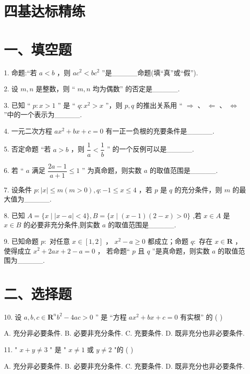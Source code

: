 \section*{四基达标精练}

\section*{一、填空题}

1. 命题:“若 $a < b$ ，则 $a{c}^{2} < b{c}^{2}$ ”是\_\_\_\_\_命题(填“真”或“假”).

2. 设 $m,n$ 是整数，则 “ $m,n$ 均为偶数” 的否定是\_\_\_\_\_.

3. 已知 “ $p : x > 1$ ” 是 “ $q : {x}^{2} > x$ ”，则 $p,q$ 的推出关系用 “ $\Rightarrow$ 、 $\Leftarrow$ 、 $\Leftrightarrow$ ”中的一个表示为\_\_\_\_\_.

4. 一元二次方程 $a{x}^{2} + {bx} + c = 0$ 有一正一负根的充要条件是\_\_\_\_\_.

5. 否定命题 “若 $a > b$ ，则 $\dfrac{1}{a} < \dfrac{1}{b}$ ” 的一个反例可以是\_\_\_\_\_.

6. 若 “ $a$ 满足 $\dfrac{{2a} - 1}{a + 1} \leq  1$ ” 为真命题，则实数 $a$ 的取值范围是\_\_\_\_\_.

7. 设条件 $p : \left| x\right|  \leq  m\left( {m > 0}\right) ,q :  - 1 \leq  x \leq  4$ ，若 $p$ 是 $q$ 的充分条件，则 $m$ 的最大值为\_\_\_\_\_.

8. 已知 $A = \{ x \mid  \left| {x - a}\right|  < 4\} ,B = \{ x \mid  \left( {x - 1}\right) \left( {2 - x}\right)  > 0\}$ ,若 $x \in  A$ 是 $x \in  B$ 的必要非充分条件,则实数 $a$ 的取值范围是\_\_\_\_\_.

9. 已知命题 $p :$ 对任意 $x \in  \left\lbrack  {1,2}\right\rbrack$ ， ${x}^{2} - a \geq  0$ 都成立；命题 $q :$ 存在 $x \in  \mathbf{R}$ ，使得成立 ${x}^{2} + {2ax} + 2 - a = 0$ ， 若命题“ $p$ 且 $q$ ”是真命题，则实数 $a$ 的取值范围为\_\_\_\_\_.

\section*{二、选择题}

10. 设 $a,b,c \in  {\mathbf{R}}^{n}{b}^{2} - {4ac} > 0$ ” 是 “方程 $a{x}^{2} + {bx} + c = 0$ 有实根” 的 ( )

A. 充分非必要条件. B. 必要非充分条件. C. 充要条件. D. 既非充分也非必要条件.

11. " $x + y \neq  3$ " 是 " $x \neq  1$ 或 $y \neq  2$ "的 ( )

A. 充分非必要条件. B. 必要非充分条件. C. 充要条件. D. 既非充分也非必要条件.


